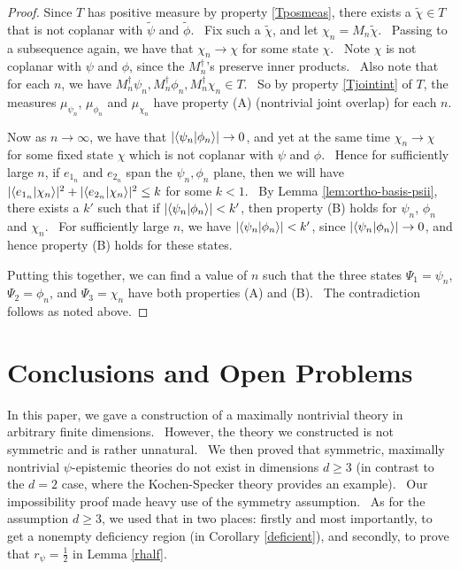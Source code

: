 \documentclass[letterpaper,11pt]{article}
\newcommand{\braket}[2]{\mbox{$ \langle #1 | #2 \rangle $}}
\begin{document}
\begin{proof}
Since $T$ has positive measure by property \ref{Tposmeas}, there exists a $\tilde{\chi} \in T$ that is not coplanar with $\tilde{\psi}$ and $\tilde{\phi}$. \ Fix such a $\tilde{\chi}$, and let $\chi_n = M_n \tilde{\chi}$. \ Passing to a subsequence again, we have that $\chi_n \rightarrow \chi$ for some state $\chi$. \ Note $\chi$ is not coplanar with $\psi$ and $\phi$, since the $M_n^\dagger$'s preserve inner products. \ Also note that for each $n$, we have $M_n^\dagger \psi_n, M_n^\dagger \phi_n, M_n^\dagger \chi_n \in T$. \ So by property \ref{Tjointint} of $T$, the measures $\mu_{\psi_n}$, $\mu_{\phi_n}$ and $\mu_{\chi_n}$ have property (A) (nontrivial joint overlap) for each $n$.

Now as $n\rightarrow \infty$, we have that $|\braket{\psi_n}{\phi_n}| \rightarrow 0$, and yet at the same time $\chi_n \rightarrow \chi$ for some fixed state $\chi$ which is not coplanar with $\psi$ and $\phi$. \ Hence for sufficiently large $n$, if $e_{1_n}$ and $e_{2_n}$ span the $\psi_n,\phi_n$ plane, then we will have $|\braket{e_{1_n}}{\chi_n}|^2+|\braket{e_{2_n}}{\chi_n}|^2\leq k$ for some $k<1$. \ By Lemma \ref{lem:ortho-basis-psii}, there exists a $k'$ such that if $|\braket{\psi_n}{\phi_n}|<k'$, then property (B) holds for $\psi_n$, $\phi_n$ and $\chi_n$. \ For sufficiently large $n$, we have $|\braket{\psi_n}{\phi_n}|<k'$, since $|\braket{\psi_n}{\phi_n}|\rightarrow 0$, and hence property (B) holds for these states.

Putting this together, we can find a value of $n$ such that the three states $\Psi_1=\psi_n$, $\Psi_2=\phi_n$, and $\Psi_3=\chi_n$ have both properties (A) and (B). \ The contradiction follows as noted above.

\end{proof}


\section{Conclusions and Open Problems}
\label{sec-conclusion}
In this paper, we gave a construction of a maximally nontrivial theory
in arbitrary finite dimensions. \ However, the theory we constructed is not
symmetric and is rather unnatural. \ We then proved that symmetric, maximally
nontrivial $\psi$-epistemic theories do not exist in dimensions $d\geq 3$ (in contrast to the $d=2$ case,
where the Kochen-Specker theory provides an example). \ Our impossibility
proof made heavy use of the symmetry assumption. \ As for the assumption $d\geq 3$, we
used that in two places: firstly and most importantly, to get a nonempty deficiency region (in Corollary \ref{deficient}), and secondly, to prove that $r_{\psi}=\frac{1}{2}$ in Lemma \ref{rhalf}.
\end{document}
